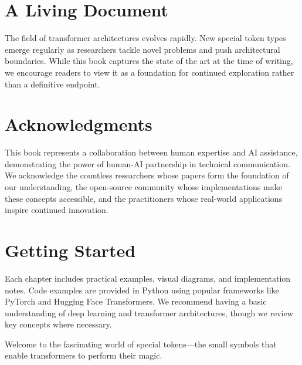 \section*{A Living Document}

The field of transformer architectures evolves rapidly. New special token types emerge regularly as researchers tackle novel problems and push architectural boundaries. While this book captures the state of the art at the time of writing, we encourage readers to view it as a foundation for continued exploration rather than a definitive endpoint.

\section*{Acknowledgments}

This book represents a collaboration between human expertise and AI assistance, demonstrating the power of human-AI partnership in technical communication. We acknowledge the countless researchers whose papers form the foundation of our understanding, the open-source community whose implementations make these concepts accessible, and the practitioners whose real-world applications inspire continued innovation.

\section*{Getting Started}

Each chapter includes practical examples, visual diagrams, and implementation notes. Code examples are provided in Python using popular frameworks like PyTorch and Hugging Face Transformers. We recommend having a basic understanding of deep learning and transformer architectures, though we review key concepts where necessary.

Welcome to the fascinating world of special tokens---the small symbols that enable transformers to perform their magic.